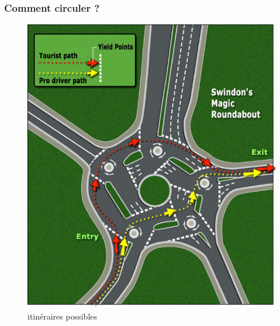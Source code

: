 \documentclass[slidetop,11pt]{beamer}
\begin{document}
\begin{frame}
	\frametitle{Comment circuler ?}
	\begin{figure}
		\begin{center}
			\includegraphics[scale=0.3]{./images/itin}
			\caption{itinéraires possibles}
		\end{center}
	\end{figure}
\end{frame}
\end{document}

